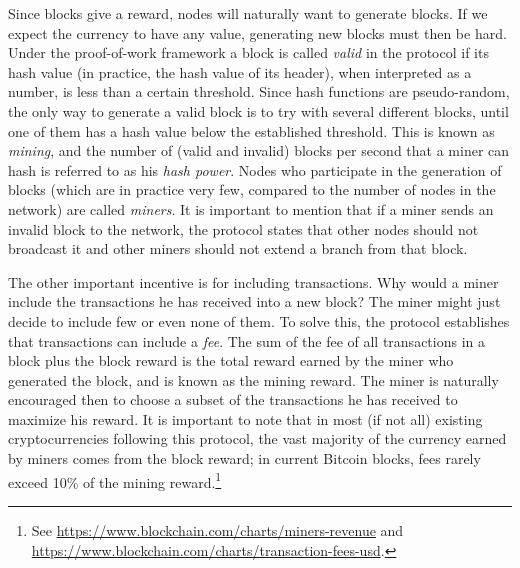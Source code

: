 Since blocks give a reward, nodes will naturally want to generate blocks. If we expect the currency to have any value, generating new blocks must then be hard. Under the proof-of-work framework a block is called \emph{valid} in the protocol if its hash value (in practice, the hash value of its header), when interpreted as a number, is less than a certain threshold. Since hash functions are pseudo-random, the only way to generate a valid block is to try with several different blocks, until one of them has a hash value below the established threshold. This is known as \emph{mining}, and the number of (valid and invalid) blocks per second that a miner can hash is referred to as his \emph{hash power}. Nodes who participate in the generation of blocks (which are in practice very few, compared to the number of nodes in the network) are called \emph{miners}. It is important to mention that if a miner sends an invalid block to the network, the protocol states that other nodes should not broadcast it and other miners should not extend a branch from that block. 

\iffalse
Assume now that a miner generates a new valid block that points to the last block of the current blockchain. He/she will try to get this new block broadcast across the network as fast as possible, because this makes the branch of such block longer, encouraging other nodes to mine on top of this new block. If he/she keeps this block private, most likely other miners will generate a longer branch without his/her node, and the miner will not be able to place his/her block in the blockchain, missing the associated reward.
\fi

The other important incentive is for including transactions. Why would a miner include the transactions he has received into a new block? The miner might just decide to include few or even none of them. To solve this, the protocol establishes that transactions can include a \emph{fee}. The sum of the fee of all transactions in a block plus the block reward is the total reward earned by the miner who generated the block, and is known as the mining reward. The miner is naturally encouraged then to choose a subset of the transactions he has received to maximize his reward. It is important to note that in most (if not all) existing cryptocurrencies following this protocol, the vast majority of the currency earned by miners comes from the block reward; in current Bitcoin blocks, fees rarely exceed 10\% of the mining reward.\footnote{See  \url{https://www.blockchain.com/charts/miners-revenue} and \url{https://www.blockchain.com/charts/transaction-fees-usd}.}


